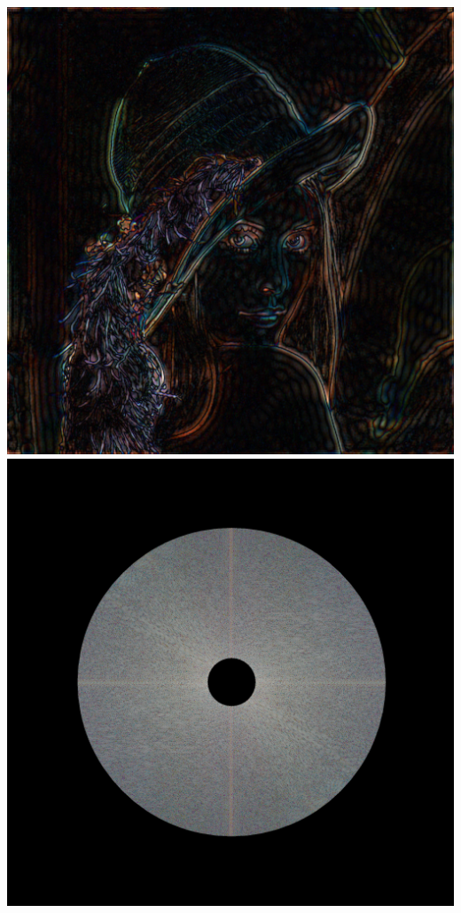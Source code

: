 \documentclass[aspectratio=169]{beamer}
\begin{document}
	\begin{frame}
		\center
		\includegraphics[scale=0.35]{example/picture-02.png}
		\hfill
		\includegraphics[scale=0.35]{example/picture-02-spec.png}
	\end{frame}
\end{document}
